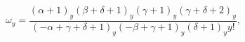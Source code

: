 \[\omega_{y}=\frac{\left(\alpha+1\right)_{y}\left(\beta+\delta+1\right)_{y}\left%
(\gamma+1\right)_{y}\left(\gamma+\delta+2\right)_{y}}{\left(-\alpha+\gamma+%
\delta+1\right)_{y}\left(-\beta+\gamma+1\right)_{y}\left(\delta+1\right)_{y}y!},\]